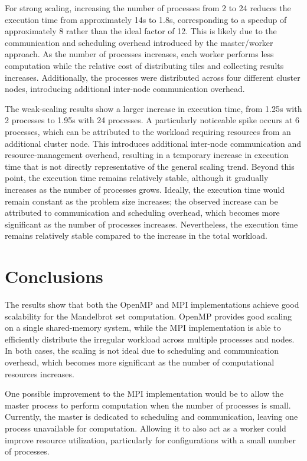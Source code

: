 \documentclass[a4paper]{article}
\begin{document}
For strong scaling, increasing the number of processes from 2 to 24 reduces the execution time from approximately 14s to 1.8s, corresponding to a speedup of approximately 8 rather than the ideal factor of 12. This is likely due to the communication and scheduling overhead introduced by the master/worker approach. As the number of processes increases, each worker performs less computation while the relative cost of distributing tiles and collecting results increases. Additionally, the processes were distributed across four different cluster nodes, introducing additional inter-node communication overhead.

The weak-scaling results show a larger increase in execution time, from 1.25s with 2 processes to 1.95s with 24 processes. A particularly noticeable spike occurs at 6 processes, which can be attributed to the workload requiring resources from an additional cluster node. This introduces additional inter-node communication and resource-management overhead, resulting in a temporary increase in execution time that is not directly representative of the general scaling trend. Beyond this point, the execution time remains relatively stable, although it gradually increases as the number of processes grows. Ideally, the execution time would remain constant as the problem size increases; the observed increase can be attributed to communication and scheduling overhead, which becomes more significant as the number of processes increases. Nevertheless, the execution time remains relatively stable compared to the increase in the total workload.

\section{Conclusions}
The results show that both the OpenMP and MPI implementations achieve good scalability for the Mandelbrot set computation. OpenMP provides good scaling on a single shared-memory system, while the MPI implementation is able to efficiently distribute the irregular workload across multiple processes and nodes. In both cases, the scaling is not ideal due to scheduling and communication overhead, which becomes more significant as the number of computational resources increases.

One possible improvement to the MPI implementation would be to allow the master process to perform computation when the number of processes is small. Currently, the master is dedicated to scheduling and communication, leaving one process unavailable for computation. Allowing it to also act as a worker could improve resource utilization, particularly for configurations with a small number of processes.
\end{document}
